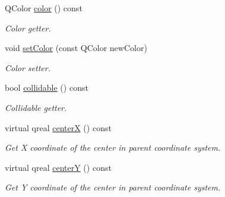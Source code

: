 \begin{DoxyCompactItemize}
Q\+Color \hyperlink{class_entity_ad14bf88ca550e2e5b13438a3faf545e6}{color} () const
\begin{DoxyCompactList}\small\item\em Color getter. \end{DoxyCompactList}\item 
void \hyperlink{class_entity_a7b88e2198ec04871dcec523d1e02e656}{set\+Color} (const Q\+Color new\+Color)
\begin{DoxyCompactList}\small\item\em Color setter. \end{DoxyCompactList}\item 
bool \hyperlink{class_entity_a0d21d9ca00bc81494aec120c0840c191}{collidable} () const
\begin{DoxyCompactList}\small\item\em Collidable getter. \end{DoxyCompactList}\item 
virtual qreal \hyperlink{class_entity_aa404777579f858d2e4dd0c584c20c95a}{centerX} () const
\begin{DoxyCompactList}\small\item\em Get X coordinate of the center in parent coordinate system. \end{DoxyCompactList}\item 
virtual qreal \hyperlink{class_entity_ac0af460a15e0d087d8fbbbe1e6f7dd95}{centerY} () const
\begin{DoxyCompactList}\small\item\em Get Y coordinate of the center in parent coordinate system. \end{DoxyCompactList}\end{DoxyCompactItemize}
